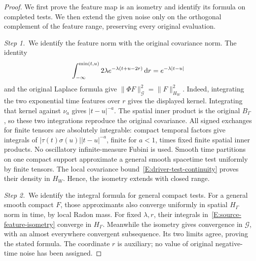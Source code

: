 \begin{proof}
  We first prove the feature map is an isometry and identify its formula on
  completed tests. We then extend the given noise only on the orthogonal
  complement of the feature range, preserving every original evaluation.

  \medskip
  \noindent\textit{Step 1.~}We identify the feature norm with the original
  covariance norm.
  The identity
  \[
    \int_{-\infty}^{\min(t,u)}
    2\lambda e^{-\lambda(t+u-2r)}\,\mathrm{d} r
    =e^{-\lambda|t-u|}
  \]
  and the original Laplace formula give $\|\Phi F\|_{\mathcal{G}}^2 =
  \|F\|_{H_W}^2$.
  Indeed, integrating the two exponential time features over $r$ gives the
  displayed kernel. Integrating that kernel against $\nu_a$ gives
  $|t-u|^{-a}$. The spatial inner product is the original $B_\Gamma$, so
  these two integrations reproduce the original covariance.
  All signed exchanges for finite tensors are absolutely
  integrable: compact temporal factors give integrals of
  $|\tau(t)\sigma(u)||t-u|^{-a}$, finite for $a < 1$, times fixed finite spatial
  inner products. No oscillatory infinite-measure Fubini is used. Smooth time
  partitions on one compact support approximate a general smooth spacetime test
  uniformly by finite tensors. The local covariance
  bound~\eqref{E:driver-test-continuity} proves their density in $H_W$. Hence,
  the isometry extends with closed range.


  \medskip
  \noindent\textit{Step 2.~}We identify the integral formula for general
  compact tests.
  For a general smooth compact $F$, those approximants also converge uniformly
  in spatial $H_\Gamma$ norm in time, by local Radon mass. For fixed
  $\lambda,r$, their integrals in~\eqref{E:source-feature-isometry} converge in
  $H_\Gamma$. Meanwhile the isometry gives convergence in $\mathcal{G}$, with an
  almost everywhere convergent subsequence. Its two limits agree, proving the
  stated formula. The coordinate $r$ is auxiliary; no value of original
  negative-time noise has been assigned.


\end{proof}
